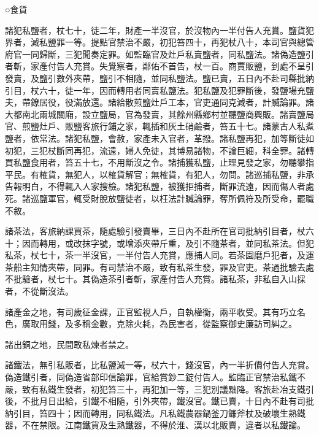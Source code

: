 
\begin{pinyinscope}

 ○食貨



 諸犯私鹽者，杖七十，徒二年，財產一半沒官，於沒物內一半付告人充賞。鹽貨犯界者，減私鹽罪一等。提點官禁治不嚴，初犯笞四十，再犯杖八十，本司官與總管府官一同歸斷，三犯聞奏定罪。如監臨官及灶戶私賣鹽者，同私鹽法。諸偽造鹽引者斬，家產付告人充賞。失覺察者，鄰佑不首告，杖一百。商賈販鹽，到處不呈引發賣，及鹽引數外夾帶，鹽引不相隨，並同私鹽法。鹽已賣，五日內不赴司縣批納引目，杖六十，徒一年，因而轉用者同賣私鹽法。犯私鹽及犯罪斷後，發鹽場充鹽夫，帶鐐居役，役滿放還。諸給散煎鹽灶戶工本，官吏通同克減者，計贓論罪。諸大都南北兩城關廂，設立鹽局，官為發賣，其餘州縣鄉村並聽鹽商興販。諸賣鹽局官、煎鹽灶戶、販鹽客旅行鋪之家，輒插和灰土硝鹼者，笞五十七。諸蒙古人私煮鹽者，依常法。諸犯私鹽，會赦，家產未入官者，革撥。諸私鹽再犯，加等斷徒如初犯，三犯杖斷同再犯，流遠，婦人免徒，其博易諸物，不論巨細，科全罪。諸轉買私鹽食用者，笞五十七，不用斷沒之令。諸捕獲私鹽，止理見發之家，勿聽攀指平民。有榷貨，無犯人，以榷貨解官；無榷貨，有犯人，勿問。諸巡捕私鹽，非承告報明白，不得輒入人家搜檢。諸犯私鹽，被獲拒捕者，斷罪流遠，因而傷人者處死。諸巡鹽軍官，輒受財脫放鹽徒者，以枉法計贓論罪，奪所佩符及所受命，罷職不敘。



 諸茶法，客旅納課買茶，隨處驗引發賣畢，三日內不赴所在官司批納引目者，杖六十；因而轉用，或改抹字號，或增添夾帶斤重，及引不隨茶者，並同私茶法。但犯私茶，杖七十，茶一半沒官，一半付告人充賞，應捕人同。若茶園磨戶犯者，及運茶船主知情夾帶，同罪。有司禁治不嚴，致有私茶生發，罪及官吏。茶過批驗去處不批驗者，杖七十。其偽造茶引者斬，家產付告人充賞。諸私茶，非私自入山採者，不從斷沒法。



 諸產金之地，有司歲征金課，正官監視人戶，自執權衡，兩平收受。其有巧立名色，廣取用錢，及多稱金數，克除火耗，為民害者，從監察御史廉訪司糾之。



 諸出銅之地，民間敢私煉者禁之。



 諸鐵法，無引私販者，比私鹽減一等，杖六十，錢沒官，內一半折價付告人充賞。偽造鐵引者，同偽造省部印信論罪，官給賞鈔二錠付告人。監臨正官禁治私鐵不嚴，致有私鐵生發者，初犯笞三十，再犯加一等，三犯別議黜降。客旅赴冶支鐵引後，不批月日出給，引鐵不相隨，引外夾帶，鐵沒官。鐵已賣，十日內不赴有司批納引目，笞四十；因而轉用，同私鐵法。凡私鐵農器鍋釜刀鐮斧杖及破壞生熟鐵器，不在禁限。江南鐵貨及生熟鐵器，不得於淮、漢以北販賣，違者以私鐵論。




\end{pinyinscope}

